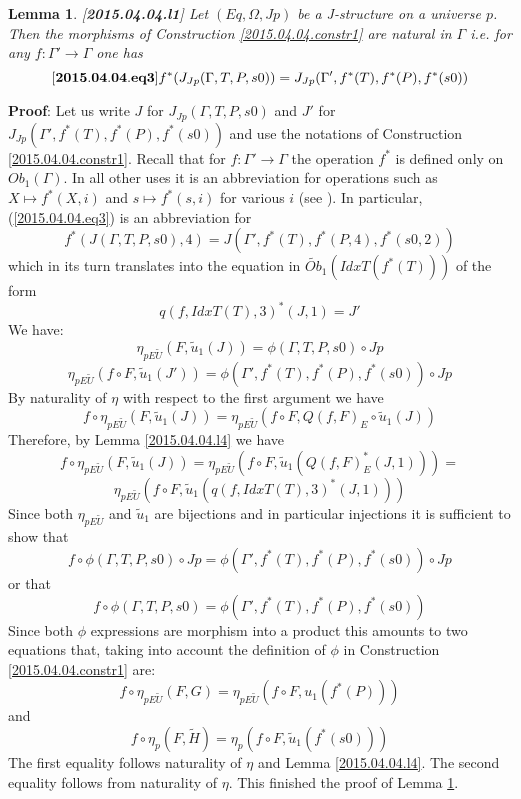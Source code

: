 \documentclass[12pt]{article}
\newenvironment{eq}{\begin{equation}}{\end{equation}}
\newenvironment{myproof}{{\bf Proof}:}{\vskip 5mm }
\newtheorem{lemma}[proposition]{Lemma}
\newcommand{\llabel}[1]{\label{#1}[{\bf #1}]}
\newcommand{\sr}{\rightarrow}
\newcommand{\wt}{\widetilde}
\begin{document}
%
\begin{lemma}
\llabel{2015.04.04.l1}
Let $(Eq,\Omega,Jp)$ be a J-structure on a universe $p$. Then the morphisms of Construction \ref{2015.04.04.constr1} are natural in $\Gamma$ i.e. for any $f:\Gamma'\sr \Gamma$ one has
%
\begin{eq}\llabel{2015.04.04.eq3}
f^*(J_{Jp}(\Gamma,T,P,s0))=J_{Jp}(\Gamma',f^*(T),f^*(P),f^*(s0))
\end{eq}
%
\end{lemma}
%
\begin{myproof}
Let us write $J$ for $J_{Jp}(\Gamma,T,P,s0)$ and $J'$ for $J_{Jp}(\Gamma',f^*(T),f^*(P),f^*(s0))$ and use the notations of Construction \ref{2015.04.04.constr1}. Recall that for $f:\Gamma'\sr \Gamma$ the operation $f^*$ is defined only on $Ob_1(\Gamma)$. In all other uses it is an abbreviation for operations such as $X\mapsto f^*(X,i)$ and $s\mapsto f^*(s,i)$ for various $i$ (see \cite{Csubsystems}). In particular, (\ref{2015.04.04.eq3}) is an abbreviation for 
%
$$f^*(J(\Gamma,T,P,s0),4)=J(\Gamma',f^*(T),f^*(P,4),f^*(s0,2))$$
%
which in its turn translates into the equation in $\wt{Ob}_1(IdxT(f^*(T)))$ of the form
%
$$q(f,IdxT(T),3)^*(J,1)=J'$$
%
We have:
%
$$\eta_{pE\wt{U}}(F,\wt{u}_1(J))=\phi(\Gamma,T,P,s0)\circ Jp$$
$$\eta_{pE\wt{U}}(f\circ F, \wt{u}_1(J'))=\phi(\Gamma',f^*(T),f^*(P),f^*(s0))\circ Jp$$
%
By naturality of $\eta$ with respect to the first argument we have
%
$$f\circ \eta_{pE\wt{U}}(F,\wt{u}_1(J))=\eta_{pE\wt{U}}(f\circ F, Q(f,F)_{E}\circ \wt{u}_1(J))$$
%
Therefore, by Lemma \ref{2015.04.04.l4} we have
%
$$f\circ \eta_{pE\wt{U}}(F,\wt{u}_1(J))=\eta_{pE\wt{U}}(f\circ F, \wt{u}_1(Q(f,F)_{E}^*(J,1)))=$$
$$\eta_{pE\wt{U}}(f\circ F, \wt{u}_1(q(f,IdxT(T),3)^*(J,1)))$$
%
Since both $\eta_{pE\wt{U}}$ and $\wt{u}_1$ are bijections and in particular injections it is sufficient to show that
%
$$f\circ \phi(\Gamma,T,P,s0)\circ Jp = \phi(\Gamma',f^*(T),f^*(P),f^*(s0))\circ Jp$$
%
or that
%
$$f\circ \phi(\Gamma,T,P,s0)=\phi(\Gamma',f^*(T),f^*(P),f^*(s0))$$
%
Since both $\phi$ expressions are morphism into a product this amounts to two equations that, taking into account the definition of $\phi$ in Construction \ref{2015.04.04.constr1} are:
%
$$f\circ \eta_{pE\wt{U}}(F,G)=\eta_{pE\wt{U}}(f\circ F, u_1(f^*(P)))$$
%
and
%
$$f\circ \eta_p(F,\wt{H})=\eta_p(f\circ F, \wt{u}_1(f^*(s0)))$$
%
The first equality follows naturality of $\eta$ and Lemma \ref{2015.04.04.l4}. The second equality follows from naturality of $\eta$. This finished the proof of Lemma \ref{2015.04.04.l1}.
\end{myproof}
\end{document}
